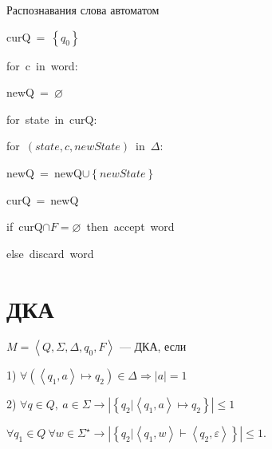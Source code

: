 \begin{algorithm*}
Распознавания слова автоматом\end{algorithm*}
\begin{lyxcode}
  curQ~=~$\left\{ q_{0}\right\} $

  for~c~in~word:
	\begin{lyxcode}
	newQ~=~$\varnothing$

	for~state~in~curQ:
	  \begin{lyxcode}
	  for~$\left(state,c,newState\right)$~in~$\Delta$:
		\begin{lyxcode}
		newQ~=~newQ$\cup\left\{ newState\right\} $
		\end{lyxcode}
	  \end{lyxcode}
	curQ~=~newQ
	\end{lyxcode}
  if~curQ$\cap F=\varnothing$~then~accept~word

  else~discard~word
\end{lyxcode}

\section{ДКА}
\begin{define*}
$M=\left\langle Q,\Sigma,\Delta,q_{0},F\right\rangle $ --- ДКА, если

1) $\forall\left(\left\langle q_{1},a\right\rangle \mapsto q_{2}\right)\in\Delta\Rightarrow\left|a\right|=1$

2) $\forall q\in Q,\ a\in\Sigma\rightarrow\left|\left\{ q_{2}|\left\langle q_{1},a\right\rangle \mapsto q_{2}\right\} \right|\le1$\end{define*}
\begin{claim*}
$\forall q_{1}\in Q\ \forall w\in\Sigma^{\star}\rightarrow\left|\left\{ q_{2}|\left\langle q_{1},w\right\rangle \vdash\left\langle q_{2},\varepsilon\right\rangle \right\} \right|\le1$.\end{claim*}



